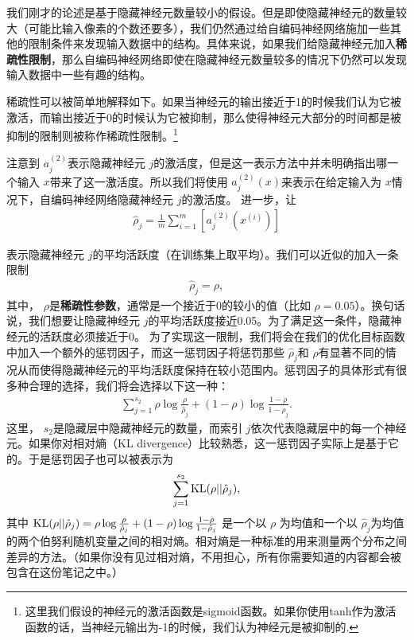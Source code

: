 我们刚才的论述是基于隐藏神经元数量较小的假设。但是即使隐藏神经元的数量较大（可能比输入像素的个数还要多），我们仍然通过给自编码神经网络施加一些其他的限制条件来发现输入数据中的结构。具体来说，如果我们给隐藏神经元加入\textbf{稀疏性限制}，那么自编码神经网络即使在隐藏神经元数量较多的情况下仍然可以发现输入数据中一些有趣的结构。

稀疏性可以被简单地解释如下。如果当神经元的输出接近于1的时候我们认为它被激活，而输出接近于0的时候认为它被抑制，那么使得神经元大部分的时间都是被抑制的限制则被称作稀疏性限制。\footnote{这里我们假设的神经元的激活函数是sigmoid函数。如果你使用tanh作为激活函数的话，当神经元输出为-1的时候，我们认为神经元是被抑制的.}

注意到 $ a^{(2)}_j $表示隐藏神经元 $ j $的激活度，但是这一表示方法中并未明确指出哪一个输入 $ x $带来了这一激活度。所以我们将使用 $ a^{(2)}_j(x) $来表示在给定输入为 $ x $情况下，自编码神经网络隐藏神经元 $ j $的激活度。 进一步，让
\begin{align}
\hat\rho_j = \frac{1}{m} \sum_{i=1}^m \left[ a^{(2)}_j(x^{(i)}) \right]
\nonumber \end{align}

表示隐藏神经元 $ j $的平均活跃度（在训练集上取平均）。我们可以近似的加入一条限制
\begin{align}
\hat\rho_j = \rho,
\nonumber \end{align}
其中， $ \rho $是\textbf{稀疏性参数}，通常是一个接近于0的较小的值（比如 $ \rho = 0.05 $）。换句话说，我们想要让隐藏神经元 $ j $的平均活跃度接近0.05。为了满足这一条件，隐藏神经元的活跃度必须接近于0。
为了实现这一限制，我们将会在我们的优化目标函数中加入一个额外的惩罚因子，而这一惩罚因子将惩罚那些 $ \hat\rho_j $和 $ \rho $有显著不同的情况从而使得隐藏神经元的平均活跃度保持在较小范围内。惩罚因子的具体形式有很多种合理的选择，我们将会选择以下这一种：
\begin{align}
\sum_{j=1}^{s_2} \rho \log \frac{\rho}{\hat\rho_j} + (1-\rho) \log \frac{1-\rho}{1-\hat\rho_j}.
\nonumber \end{align}
这里， $ s_2 $是隐藏层中隐藏神经元的数量，而索引 $ j $依次代表隐藏层中的每一个神经元。如果你对相对熵（KL divergence）比较熟悉，这一惩罚因子实际上是基于它的。于是惩罚因子也可以被表示为
\begin{align}
\sum_{j=1}^{s_2} {\rm KL}(\rho || \hat\rho_j),
\nonumber \end{align}
其中 $ {\rm KL}(\rho || \hat\rho_j)
 = \rho \log \frac{\rho}{\hat\rho_j} + (1-\rho) \log \frac{1-\rho}{1-\hat\rho_j}$  是一个以 $ \rho$ 为均值和一个以 $ \hat\rho_j $为均值的两个伯努利随机变量之间的相对熵。相对熵是一种标准的用来测量两个分布之间差异的方法。（如果你没有见过相对熵，不用担心，所有你需要知道的内容都会被包含在这份笔记之中。）


